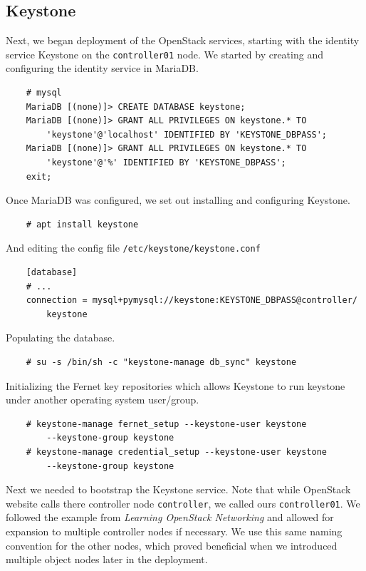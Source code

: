 \documentclass{article}
\begin{document}
\subsection{Keystone}
Next, we began deployment of the OpenStack services, starting with the identity service Keystone on the \texttt{controller01} node. We started by creating and configuring the identity service in MariaDB.

\begin{verbatim}
    # mysql
    MariaDB [(none)]> CREATE DATABASE keystone;
    MariaDB [(none)]> GRANT ALL PRIVILEGES ON keystone.* TO 
        'keystone'@'localhost' IDENTIFIED BY 'KEYSTONE_DBPASS';
    MariaDB [(none)]> GRANT ALL PRIVILEGES ON keystone.* TO 
        'keystone'@'%' IDENTIFIED BY 'KEYSTONE_DBPASS';
    exit;
\end{verbatim}

Once MariaDB was configured, we set out installing and configuring Keystone.

\begin{verbatim}
    # apt install keystone
\end{verbatim}

And editing the config file \texttt{/etc/keystone/keystone.conf}

\begin{verbatim}
    [database]
    # ...
    connection = mysql+pymysql://keystone:KEYSTONE_DBPASS@controller/
        keystone
\end{verbatim}
Populating the database.
\begin{verbatim}
    # su -s /bin/sh -c "keystone-manage db_sync" keystone
\end{verbatim}
Initializing the Fernet key repositories which allows Keystone to run keystone under another operating system user/group.

\begin{verbatim}
    # keystone-manage fernet_setup --keystone-user keystone 
        --keystone-group keystone
    # keystone-manage credential_setup --keystone-user keystone 
        --keystone-group keystone
\end{verbatim}

Next we needed to bootstrap the Keystone service. Note that while OpenStack website calls there controller node \texttt{controller}, we called ours \texttt{controller01}. We followed the example from \textit{Learning OpenStack Networking} and allowed for expansion to multiple controller nodes if necessary. We use this same naming convention for the other nodes, which proved beneficial when we introduced multiple object nodes later in the deployment.
\end{document}
